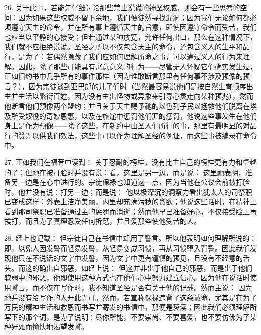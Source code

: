26. 关于此事，若能先仔细讨论那些禁止说谎的神圣权威，则会有一些思考的空间：因为如果这些权威不留下余地，我们便徒然寻找漏洞；因为我们无论如何都必须遵守天主的命令，并在所有事上遵循天主的旨意，即使因遵守命令而受苦，我们也应当以平静的心接受；但若通过某种放宽，允许任何出口，那么在这种情况下，我们就不应拒绝说谎。圣经之所以不仅包含天主的命令，还包含义人的生平和品行，是为了：若偶然隐藏了我们应如何理解所命之事，可以通过义人的行为来理解。因此，除了那些可能具有寓意意义的行为——尽管无人怀疑它们确实发生过，正如旧约书中几乎所有的事件那样（因为谁敢断言那里有任何事不涉及预像的预言？），因为宗徒谈到亚巴郎的儿子们时（当然最容易说他们是按自然生育顺序出生并生活以繁衍百姓，因为没有生出怪物或异象来引导心灵走向某种预兆），然而他断言他们预像两个盟约；并且关于天主赐予祂的以色列子民以拯救他们脱离在埃及所受奴役的奇妙恩惠，以及在旅途中惩罚他们罪的惩罚，他说这些事发生在他们身上是作为预像——除了这些，在新约中由圣人们所行的事，那里有最明显的对品行的赞许以供我们效法，这些事可以作为理解圣经的例证，而这些事被编录在命令中。\par

27. 正如我们在福音中读到： 关于忍耐的榜样，没有比主自己的榜样更有力和卓越的了；但祂在被打脸时并没有说：看，这里是另一边，而是说： 这里祂表明，准备另一边是在心中进行的。宗徒保禄也知道这一点，因为当他在公议会前被打脸时，他并没有说：打另一边；而是说： 他以极深沉的洞察力看出犹太人的司祭职已变成这样：外表上洁净美丽，内里却充满污秽的贪欲；他说这些话时，在精神上看到那司祭职已准备通过主的惩罚而消逝；然而他早已准备好心，不仅接受脸上再挨打，而且为了真理忍受任何折磨，并且爱那些使他受苦的人。\par

28. 经上也记载： 但宗徒自己在书信中却用了誓言。所以他表明如何理解所说的： 即，以免人因发誓而轻易发誓，从轻易变成习惯，再从习惯堕入背誓。因此我们发现他只在不说话的文字中发誓，因为文字中更有谨慎的预见，且没有不经意的舌头。而这的确出自邪恶，如经上说： 但这并非出于他自己的邪恶，而是出于他们软弱中的邪恶，他即使用这种方式也在他们心中努力建立信心。因为他在说话时使用誓言，而不仅在写作时，我不知道圣经是否有关于他的记载。然而主说： 因为祂并没有给写作的人开此许可。然而，若宣称保禄违背了这条诫命，尤其是在为了万民的精神生活和救恩而书写并寄发的书信中，那便是亵渎；因此我们必须理解所写下的那个词，是为了说明：尽你所能，不要崇尚、不要喜爱，也不要仿佛为了某种好处而愉快地渴望发誓。\par

